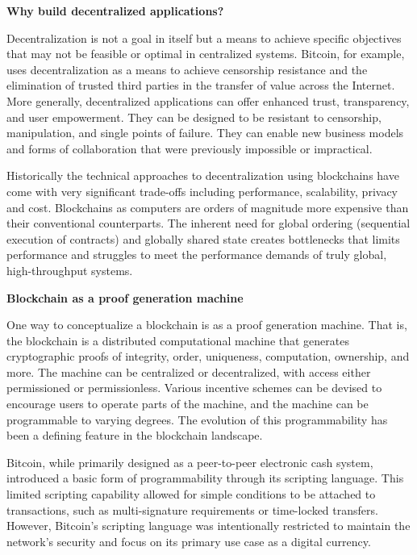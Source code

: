 \documentclass{article}
\begin{document}
\textbf{Why build decentralized applications?}
\vspace{2mm}

Decentralization is not a goal in itself but a means to achieve specific objectives that may not be feasible or optimal in centralized systems. Bitcoin, for example, uses decentralization as a means to achieve censorship resistance and the elimination of trusted third parties in the transfer of value across the Internet. More generally, decentralized applications can offer enhanced trust, transparency, and user empowerment. They can be designed to be resistant to censorship, manipulation, and single points of failure. They can enable new business models and forms of collaboration that were previously impossible or impractical. 

\vspace{2mm}

	Historically the technical approaches to decentralization using blockchains have come with very significant trade-offs including performance, scalability, privacy and cost. Blockchains as computers are orders of magnitude more expensive than their conventional counterparts. The inherent need for global ordering (sequential execution of contracts) and globally shared state creates bottlenecks that limits performance and struggles to meet the performance demands of truly global, high-throughput systems. 
\vspace{2mm}


\vspace{2mm}
\textbf{Blockchain as a proof generation machine}
\vspace{2mm}

One way to conceptualize a blockchain is as a proof generation machine. That is, the blockchain is a distributed computational machine that generates cryptographic proofs of integrity, order, uniqueness, computation, ownership, and more. The machine can be centralized or decentralized, with access either permissioned or permissionless. Various incentive schemes can be devised to encourage users to operate parts of the machine, and the machine can be programmable to varying degrees. The evolution of this programmability has been a defining feature in the blockchain landscape.
\vspace{2mm}

Bitcoin, while primarily designed as a peer-to-peer electronic cash system, introduced a basic form of programmability through its scripting language. This limited scripting capability allowed for simple conditions to be attached to transactions, such as multi-signature requirements or time-locked transfers. However, Bitcoin's scripting language was intentionally restricted to maintain the network's security and focus on its primary use case as a digital currency.
\end{document}
